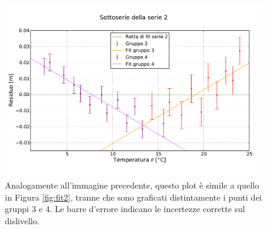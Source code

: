 \begin{figure}[p]
    \centering
    \includegraphics[width=130mm]{immagini/fit2r.pdf}
    \caption{Analogamente all'immagine precedente, questo plot è simile a quello in Figura \ref{fig:fit2},
    tranne che sono graficati distintamente i punti dei gruppi 3 e 4. Le barre d'errore indicano le incertezze
    corrette sul dislivello.}
    \label{fig:fit2r}
\end{figure}
